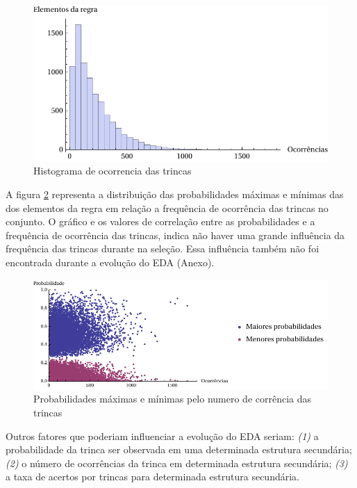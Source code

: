 \begin{figure}
  \centering
  \includegraphics[width=1\textwidth]{figures/histograma_occ.pdf}
  \caption{Histograma de ocorrencia das trincas}
        \label{fig:histograma_occ}
\end{figure}

A figura \ref{fig:probG999_occXprob} representa a distribuição das probabilidades máximas e mínimas das dos elementos da regra em relação a frequência de ocorrência das trincas no conjunto. O gráfico e os valores de correlação entre as probabilidades e a frequência de ocorrência das trincas,  indica não haver uma grande influência da frequência das trincas durante na seleção. Essa influência também não foi encontrada durante a evolução do EDA (Anexo).  


\begin{figure}
  \centering
  \includegraphics[width=1\textwidth]{figures/probG999_occXprob.pdf}
  \caption{Probabilidades máximas e mínimas pelo numero de corrência das trincas}
        \label{fig:probG999_occXprob}
\end{figure}


Outros fatores que poderiam influenciar a evolução do EDA seriam: \textit{(1)} a probabilidade da trinca ser observada em uma determinada estrutura secundária; \textit{(2)} o número de ocorrências da trinca em determinada estrutura secundária; \textit{(3)} a taxa de acertos por trincas para determinada estrutura secundária.     

